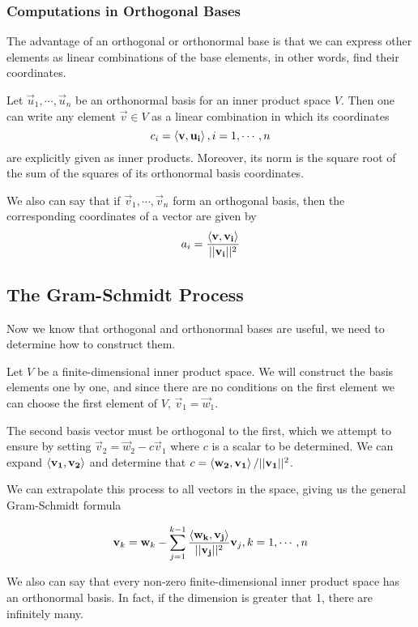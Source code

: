         \subsubsection{Computations in Orthogonal Bases}
        The advantage of an orthogonal or orthonormal base is that we can express other elements as linear combinations of the base elements, in other words, find their coordinates.
        \begin{thm}
            Let $\vec{u}_1, \cdots, \vec{u}_n$ be an orthonormal basis for an inner product space $V$. Then one can write any element $\vec{v} \in V$ as a linear combination in which its coordinates
                \[ c_i = \left\langle \mathbf{v}, \mathbf{u_i} \right\rangle, i=1, \cdots, n \]
            are explicitly given as inner products. Moreover, its norm is the square root of the sum of the squares of its orthonormal basis coordinates.

            We also can say that if $\vec{v}_1, \cdots, \vec{v}_n$ form an orthogonal basis, then the corresponding coordinates of a vector are given by
                \[ a_i = \frac{\left\langle \mathbf{v}, \mathbf{v_i} \right\rangle}{\lvert \lvert \mathbf{v_i} \rvert \rvert^2} \]
        \end{thm}

    \subsection{The Gram-Schmidt Process}
    Now we know that orthogonal and orthonormal bases are useful, we need to determine how to construct them.

    Let $V$ be a finite-dimensional inner product space. We will construct the basis elements one by one, and since there are no conditions on the first element we can choose the first element of $V$, $\vec{v}_1 = \vec{w}_1$.

    The second basis vector must be orthogonal to the first, which we attempt to ensure by setting $\vec{v}_2 = \vec{w}_2 - c \vec{v}_1$ where $c$ is a scalar to be determined. We can expand $\left\langle \mathbf{v_1}, \mathbf{v_2} \right\rangle$ and determine that $c = \left\langle \mathbf{w_2}, \mathbf{v_1} \right\rangle / \lvert \lvert \mathbf{v_1} \rvert \rvert^2$.

    We can extrapolate this process to all vectors in the space, giving us the general Gram-Schmidt formula

        \[ \mathbf{v}_k = \mathbf{w}_k - \sum^{k - 1}_{j = 1} \frac{\left\langle \mathbf{w_k}, \mathbf{v_j} \right\rangle}{\lvert \lvert \mathbf{v_j} \rvert \rvert^2} \mathbf{v}_j, k = 1, \cdots, n \]

    We also can say that every non-zero finite-dimensional inner product space has an orthonormal basis. In fact, if the dimension is greater that 1, there are infinitely many.

